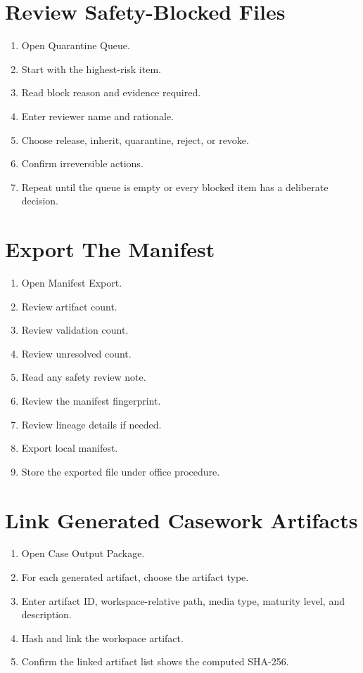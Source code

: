 \section{Review Safety-Blocked Files}

\begin{enumerate}
  \item Open Quarantine Queue.
  \item Start with the highest-risk item.
  \item Read block reason and evidence required.
  \item Enter reviewer name and rationale.
  \item Choose release, inherit, quarantine, reject, or revoke.
  \item Confirm irreversible actions.
  \item Repeat until the queue is empty or every blocked item has a deliberate decision.
\end{enumerate}

\section{Export The Manifest}

\begin{enumerate}
  \item Open Manifest Export.
  \item Review artifact count.
  \item Review validation count.
  \item Review unresolved count.
  \item Read any safety review note.
  \item Review the manifest fingerprint.
  \item Review lineage details if needed.
  \item Export local manifest.
  \item Store the exported file under office procedure.
\end{enumerate}

\section{Link Generated Casework Artifacts}

\begin{enumerate}
  \item Open Case Output Package.
  \item For each generated artifact, choose the artifact type.
  \item Enter artifact ID, workspace-relative path, media type, maturity level, and description.
  \item Hash and link the workspace artifact.
  \item Confirm the linked artifact list shows the computed SHA-256.
\end{enumerate}

